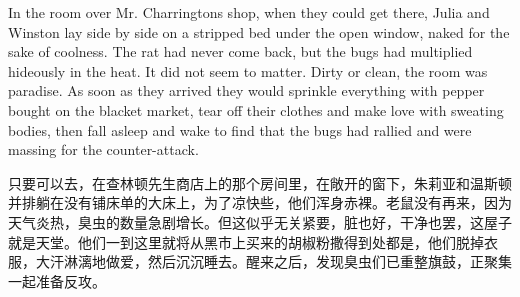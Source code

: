 \begin{paracol}{2}
In the room over Mr. Charrington\textquotesingle s shop, when they could
get there, Julia and Winston lay side by side on a stripped bed under
the open window, naked for the sake of coolness. The rat had never come
back, but the bugs had multiplied hideously in the heat. It did not seem
to matter. Dirty or clean, the room was paradise. As soon as they
arrived they would sprinkle everything with pepper bought on the blacket
market, tear off their clothes and make love with sweating bodies, then
fall asleep and wake to find that the bugs had rallied and were massing
for the counter-attack.

\switchcolumn

只要可以去，在查林顿先生商店上的那个房间里，在敞开的窗下，朱莉亚和温斯顿并排躺在没有铺床单的大床上，为了凉快些，他们浑身赤裸。老鼠没有再来，因为天气炎热，臭虫的数量急剧增长。但这似乎无关紧要，脏也好，干净也罢，这屋子就是天堂。他们一到这里就将从黑市上买来的胡椒粉撒得到处都是，他们脱掉衣服，大汗淋漓地做爱，然后沉沉睡去。醒来之后，发现臭虫们已重整旗鼓，正聚集一起准备反攻。

\switchcolumn*


\end{paracol}
